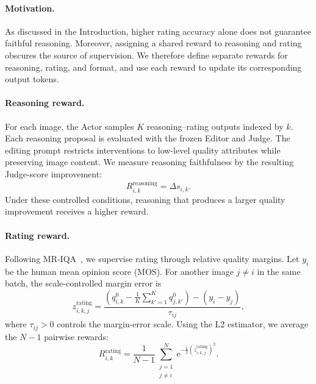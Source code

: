 \documentclass[letterpaper]{article} %
\begin{document}
\paragraph{Motivation.}
As discussed in the Introduction, higher rating accuracy alone does not
guarantee faithful reasoning. Moreover, assigning a shared reward to reasoning
and rating obscures the source of supervision. We therefore define separate
rewards for reasoning, rating, and format, and use each reward to update its
corresponding output tokens.

\paragraph{Reasoning reward.}
For each image, the Actor samples $K$ reasoning--rating outputs indexed by
$k$. Each reasoning proposal is evaluated with the frozen Editor and
Judge. The editing prompt restricts interventions to low-level quality
attributes while preserving image content. We measure reasoning faithfulness
by the resulting Judge-score improvement:
\begin{equation}
    R_{i,k}^{\mathrm{reasoning}}
    =
    \Delta s_{i,k}.
    \label{eq:reasoning-reward}
\end{equation}
Under these controlled conditions, reasoning that produces a larger quality
improvement receives a higher reward.

\paragraph{Rating reward.}
Following MR-IQA~\citep{mr-iqa}, we supervise rating through relative quality
margins. Let $y_i$ be the human mean opinion score (MOS). For another image
$j\ne i$ in the same batch, the scale-controlled margin error is
\begin{equation}
    z_{i,k,j}^{\mathrm{rating}}
    =
    \frac{
    \left(q_{i,k}^0-\frac{1}{K}\sum_{k'=1}^{K}q_{j,k'}^0\right)
    -
    \left(y_i-y_j\right)
    }{\tau_{ij}},
    \label{eq:rating-margin-error}
\end{equation}
where $\tau_{ij}>0$ controls the margin-error scale. Using the L2 estimator, we
average the $N-1$ pairwise rewards:
\begin{equation}
    R_{i,k}^{\mathrm{rating}}
    =
    \frac{1}{N-1}
    \sum_{\substack{j=1\\j\ne i}}^{N}
    \mathrm{e}^{-\frac{1}{2}\left(z_{i,k,j}^{\mathrm{rating}}\right)^2}.
    \label{eq:rating-reward}
\end{equation}
\end{document}
